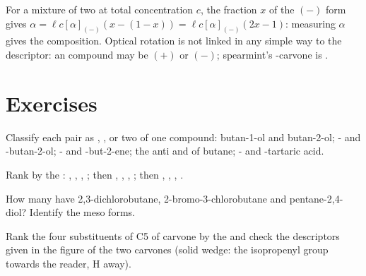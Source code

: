 For a mixture of two  at total concentration $c$, the fraction
$x$ of the $(-)$ form gives $\alpha = \ell c[\alpha]_{(-)}(x - (1 - x)) =
\ell c[\alpha]_{(-)}(2x - 1)$: measuring $\alpha$ gives the composition.
Optical rotation is not linked in any simple way to the descriptor: an
 compound may be $(+)$ or $(-)$; spearmint's -carvone is
.

\section{Exercises}

\begin{exercise}[$\star$]\label{exo:b1:stereochemistry-in-depth:1}
Classify each pair as , , 
or two  of one compound: butan-1-ol and butan-2-ol;
- and -butan-2-ol; - and -but-2-ene; the anti
and  of butane; - and -tartaric
acid.
\end{exercise}

\begin{exercise}[$\star$]\label{exo:b1:stereochemistry-in-depth:2}
Rank by the : , , , ; then
, , , ; then ,
, , .
\end{exercise}

\begin{exercise}[$\star$]\label{exo:b1:stereochemistry-in-depth:3}
How many  have 2,3-dichlorobutane, 2-bromo-3-chlorobutane
and pentane-2,4-diol? Identify the meso forms.
\end{exercise}

\begin{exercise}[$\star$]\label{exo:b1:stereochemistry-in-depth:4}
Rank the four substituents of C5 of carvone by the  and check
the descriptors given in the figure of the two carvones (solid wedge:
the isopropenyl group towards the reader, H away).
\end{exercise}

